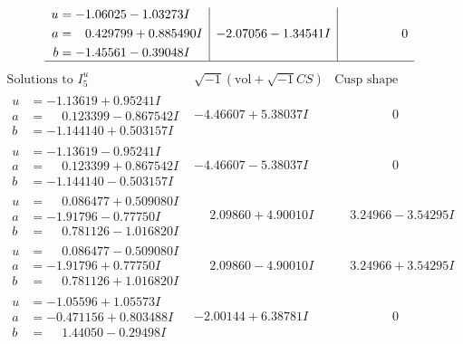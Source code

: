 \documentclass[1p]{elsarticle_modified}
\theoremstyle{definition}
\newcommand{\I}{\sqrt{-1}}
\begin{document}
$$\begin{array}{c|c|c}
\begin{aligned}
u &= -1.06025 - 1.03273 I \\
a &= \phantom{-}0.429799 + 0.885490 I \\
b &= -1.45561 - 0.39048 I\end{aligned}
 & -2.07056 - 1.34541 I & \phantom{-0.000000 } 0\\
 \hline 
 \end{array}$$\newpage$$\begin{array}{c|c|c}  
\text{Solutions to }I^u_{5}& \I (\text{vol} + \sqrt{-1}CS) & \text{Cusp shape}\\
 \hline 
\begin{aligned}
u &= -1.13619 + 0.95241 I \\
a &= \phantom{-}0.123399 - 0.867542 I \\
b &= -1.144140 + 0.503157 I\end{aligned}
 & -4.46607 + 5.38037 I & \phantom{-0.000000 } 0 \\ \hline\begin{aligned}
u &= -1.13619 - 0.95241 I \\
a &= \phantom{-}0.123399 + 0.867542 I \\
b &= -1.144140 - 0.503157 I\end{aligned}
 & -4.46607 - 5.38037 I & \phantom{-0.000000 } 0 \\ \hline\begin{aligned}
u &= \phantom{-}0.086477 + 0.509080 I \\
a &= -1.91796 - 0.77750 I \\
b &= \phantom{-}0.781126 - 1.016820 I\end{aligned}
 & \phantom{-}2.09860 + 4.90010 I & \phantom{-}3.24966 - 3.54295 I \\ \hline\begin{aligned}
u &= \phantom{-}0.086477 - 0.509080 I \\
a &= -1.91796 + 0.77750 I \\
b &= \phantom{-}0.781126 + 1.016820 I\end{aligned}
 & \phantom{-}2.09860 - 4.90010 I & \phantom{-}3.24966 + 3.54295 I \\ \hline\begin{aligned}
u &= -1.05596 + 1.05573 I \\
a &= -0.471156 + 0.803488 I \\
b &= \phantom{-}1.44050 - 0.29498 I\end{aligned}
 & -2.00144 + 6.38781 I & \phantom{-0.000000 } 0 \\ \hline\begin{aligned}

\end{aligned}
\end{array}$$
\end{document}
